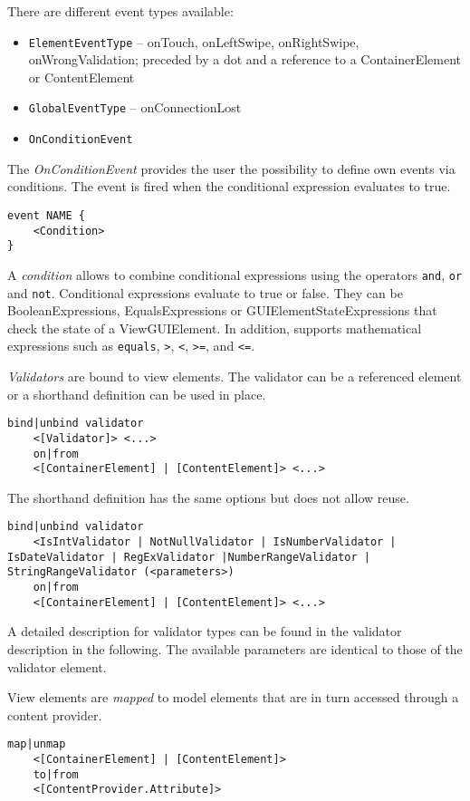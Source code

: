 There are different event types available:
\begin{itemize}
\item \lstinline!ElementEventType! -- onTouch, onLeftSwipe, onRightSwipe, onWrongValidation; preceded by a dot and a reference to a ContainerElement or ContentElement
\item \lstinline!GlobalEventType! -- onConnectionLost
\item \lstinline!OnConditionEvent!
\end{itemize}


The \textit{OnConditionEvent} provides the user the possibility to define own events via conditions. The event is fired when the conditional expression evaluates to true.
\begin{lstlisting}
event NAME {
	<Condition>
}
\end{lstlisting}

A \textit{condition} allows to combine conditional expressions using the operators \lstinline!and!, \lstinline!or! and \lstinline!not!. Conditional expressions evaluate to true or false. They can be BooleanExpressions, EqualsExpressions or GUIElementStateExpressions that check the state of a ViewGUIElement. In addition, \MD supports mathematical expressions such as \lstinline!equals!, \lstinline!>!, \lstinline!<!, \lstinline!>=!, and \lstinline!<=!.

\textit{Validators} are bound to view elements. The validator can be a referenced element or a shorthand definition can be used in place.
\begin{lstlisting}
bind|unbind validator
	<[Validator]> <...>
	on|from
	<[ContainerElement] | [ContentElement]> <...>
\end{lstlisting}

The shorthand definition has the same options but does not allow reuse.
\begin{lstlisting}
bind|unbind validator
	<IsIntValidator | NotNullValidator | IsNumberValidator | IsDateValidator | RegExValidator |NumberRangeValidator | StringRangeValidator (<parameters>)
	on|from
	<[ContainerElement] | [ContentElement]> <...>
\end{lstlisting}

A detailed description for validator types can be found in the validator description in the following. The available parameters are identical to those of the validator element.

View elements are \textit{mapped} to model elements that are in turn accessed through a content provider.
\begin{lstlisting}
map|unmap
	<[ContainerElement] | [ContentElement]>
	to|from
	<[ContentProvider.Attribute]>

\end{lstlisting}

